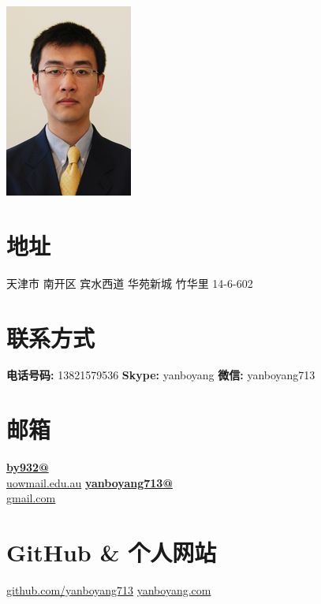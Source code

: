 \documentclass[]{friggeri-cv}
\begin{document}
     

\begin{aside}
  \includegraphics[scale=0.07]{img/boyang.png}
  \section{地址}
  天津市 南开区 宾水西道 华苑新城 竹华里 14-6-602
    ~
  \section{联系方式}
    \textbf{电话号码:} 13821579536
    \textbf{Skype:} yanboyang
    \textbf{微信:} yanboyang713
    ~
  \section{邮箱}
    \href{mailto:by932@uowmail.edu.au}{\textbf{by932@}\\uowmail.edu.au}
    \href{mailto:yanboyang713@gmail.com}{\textbf{yanboyang713@}\\gmail.com}
    ~
  \section{GitHub \& 个人网站}
    \href{https://github.com/yanboyang713}{github.com/yanboyang713}
    \href{http://www.yanboyang.com}{yanboyang.com}
    ~

\end{aside}
\end{document}
